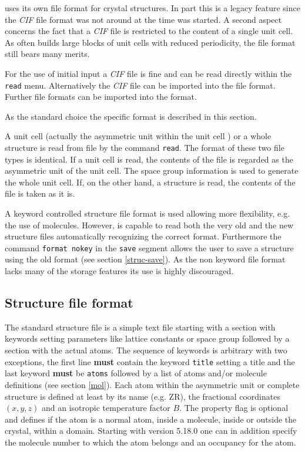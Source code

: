 \Discus uses its own file format for crystal structures. In part this 
is a legacy feature since the {\it CIF} file format was not around at the time 
\Discus was started. A second aspect concerns the fact that a {\it CIF} file 
is restricted to the content of a single unit cell. As \Discus 
often builds large blocks of unit cells with reduced periodicity, 
the \Discus file format still bears many merits.

For the use of initial input a {\it CIF} file is fine and can be 
read directly 
within the {\tt read} menu. Alternatively the {\it CIF} file can
be imported into the \Discus file format. Further file formats can 
be imported into the \Discus format.

As the standard choice the \Discus 
specific format is described in this section.

A unit cell (actually the asymmetric unit within the unit cell )
or a whole structure is read from file by the command
{\tt read}. The format of these two file types is identical.  If a
unit cell is read, the contents of the file is regarded as the
asymmetric unit of the unit cell.  The space group information is
used to generate the whole unit cell. If, on the other hand, a
structure is read, the contents of the file is taken as it is.  \par

A keyword controlled structure file format is used allowing more
flexibility, e.g. the use of molecules. However, \Discus is
capable to read both the very old and the new structure files
automatically recognizing the correct format. Furthermore the
command {\tt format nokey} in the {\tt save} segment allows the user
to save a structure using the old format (see section
\ref{struc-save}). As the non keyword file format lacks many of
the storage features its use is highly discouraged.


\subsection{Structure file format \label{struc-new}}

The standard \Discus structure file is a simple text file starting
with a section with keywords setting parameters like lattice
constants or space group followed by a section with the actual
atoms. The sequence of keywords is arbitrary with two exceptions,
the first line {\bf must} contain the keyword {\tt title} setting a
title and the last keyword {\bf must} be {\tt atoms} followed by a list of
atoms and/or molecule definitions (see section \ref{mol}). Each atom
within the asymmetric unit or complete structure is defined 
at least by its
name (e.g. ZR), the fractional coordinates $(x,y,z)$ and an
isotropic temperature factor $B$. The property flag is optional
and defines if the atom is a normal atom, inside a molecule, inside
or outside the crystal, within a domain. 
Starting with version 5.18.0 one can in addition specify the 
molecule number to which the atom belongs and an occupancy for the atom.

